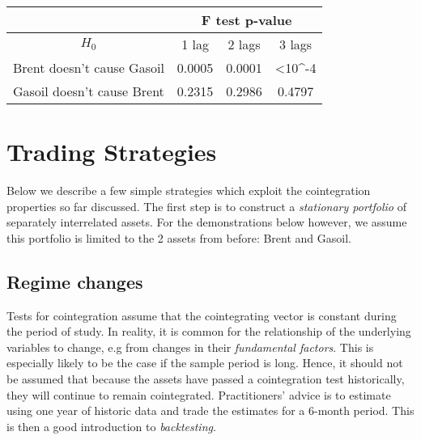 \documentclass[11pt]{article}
\begin{document}
       
\begin{table}[!ht]
\centering
\label{tabcausality}
\begin{tabular}{c|c|c|c|}
\cline{2-4}
                                                 & \multicolumn{3}{c|}{F test p-value}                     \\ \hline
\multicolumn{1}{|c|}{ $H_0$}                & 1 lag & 2 lags & 3 lags                 \\ \hline
\multicolumn{1}{|c|}{Brent doesn't cause Gasoil} & 0.0005         & 0.0001          & \textless 10\textasciicircum -4 \\ \hline
\multicolumn{1}{|c|}{Gasoil doesn’t cause Brent} & 0.2315         & 0.2986          & 0.4797                          \\ \hline
\end{tabular}
\end{table}




\newpage

    \section{Trading Strategies}\label{trading-strategies}
    
    Below we describe a few simple strategies which exploit the cointegration
properties so far discussed. The first step is to construct a \emph{stationary
portfolio} of separately interrelated assets. For the demonstrations
below however, we assume this portfolio is limited to the 2 assets from before: Brent
and Gasoil.

    \subsection{Regime changes}\label{regime-changes}
    
Tests for cointegration assume that the cointegrating vector is constant
during the period of study. In reality, it is common for the relationship of the underlying variables to change, e.g from changes in their
\emph{fundamental factors}. This is especially likely to be the case if
the sample period is long. Hence, it should not be assumed that because
the assets have passed a cointegration test historically, they will
continue to remain cointegrated. Practitioners' advice is to estimate
using one year of historic data and trade the estimates for a 6-month
period.
This is then a good introduction to {\em backtesting}.
\end{document}
